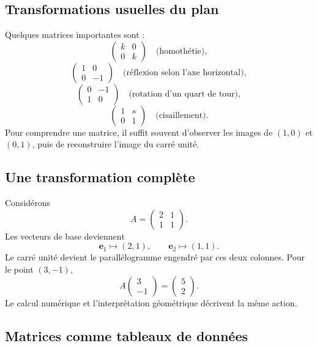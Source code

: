 \documentclass[12pt,a4paper,openany]{book}
\begin{document}
\subsection{Transformations usuelles du plan}

Quelques matrices importantes sont :
\[
\begin{pmatrix}k&0\\0&k\end{pmatrix}
\quad\text{(homothétie)},
\]
\[
\begin{pmatrix}1&0\\0&-1\end{pmatrix}
\quad\text{(réflexion selon l'axe horizontal)},
\]
\[
\begin{pmatrix}0&-1\\1&0\end{pmatrix}
\quad\text{(rotation d'un quart de tour)},
\]
\[
\begin{pmatrix}1&s\\0&1\end{pmatrix}
\quad\text{(cisaillement)}.
\]
Pour comprendre une matrice, il suffit souvent d'observer les images de $(1,0)$ et $(0,1)$, puis de reconstruire l'image du carré unité.

\subsection{Une transformation complète}

Considérons
\[
A=\begin{pmatrix}2&1\\1&1\end{pmatrix}.
\]
Les vecteurs de base deviennent
\[
\mathbf e_1\mapsto(2,1),
\qquad
\mathbf e_2\mapsto(1,1).
\]
Le carré unité devient le parallélogramme engendré par ces deux colonnes. Pour le point $(3,-1)$,
\[
A\begin{pmatrix}3\\-1\end{pmatrix}
=
\begin{pmatrix}5\\2\end{pmatrix}.
\]
Le calcul numérique et l'interprétation géométrique décrivent la même action.

\subsection{Matrices comme tableaux de données}
\end{document}
